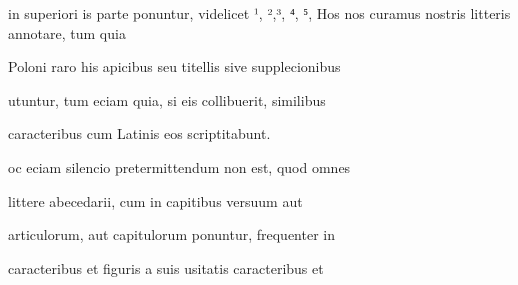 





in superiori is parte ponuntur, videlicet ¹, ²,³, ⁴, ⁵,  Hos 
nos curamus nostris litteris annotare, tum quia 

Poloni raro his apicibus seu titellis sive supplecionibus 

utuntur, tum eciam quia, si eis collibuerit, similibus 

caracteribus cum Latinis eos scriptitabunt. 

\indentP {}oc eciam silencio pretermittendum non est, quod omnes 

littere abecedarii, cum in capitibus versuum aut 

articulorum, aut capitulorum ponuntur, frequenter in 

caracteribus et figuris a suis usitatis caracteribus et 

